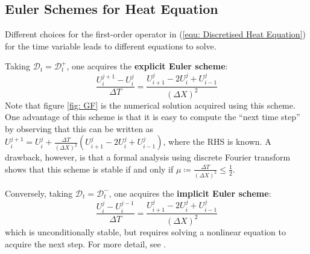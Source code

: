 \documentclass[../dissertation.tex]{subfiles}
\begin{document}
\subsection{Euler Schemes for Heat Equation}
Different choices for the first-order operator in (\ref{equ: Discretised Heat Equation}) for the time variable leads to different equations to solve.

Taking $\mathcal{D}_t = \mathcal{D}_t^+$, one acquires the \textbf{explicit Euler scheme}:
\begin{equation}
    \frac{U_{i}^{j+1} - U_{i}^j}{\Delta T} = \frac{U_{i+1}^j - 2 U_{i}^{j} + U_{i-1}^j}{\left( \Delta X \right)^2}
\end{equation}
Note that figure \ref{fig: GF} is the numerical solution acquired using this scheme.
One advantage of this scheme is that it is easy to compute the ``next time step'' by observing that this can be written as $U_{i}^{j+1} = U_{i}^j + \frac{\Delta T}{\left( \Delta X \right)^2} \left( U_{i+1}^j - 2 U_{i}^j + U_{i-1}^{j} \right)$,
where the RHS is known.
A drawback, however, is that a formal analysis using discrete Fourier transform shows that this scheme is stable if and only if $\mu \coloneqq \frac{\Delta T}{\left( \Delta X \right)^2} \leq \frac{1}{2}$.

Conversely, taking $\mathcal{D}_t = \mathcal{D}_t^-$, one acquires the \textbf{implicit Euler scheme}:
\begin{equation}
    \frac{U_{i}^{j} - U_{i}^{j-1}}{\Delta T} = \frac{U_{i+1}^j - 2 U_{i}^{j} + U_{i-1}^j}{\left( \Delta X \right)^2}
\end{equation}
which is unconditionally stable, but requires solving a nonlinear equation to acquire the next step.
For more detail, see \cite{nspde}.
\end{document}
